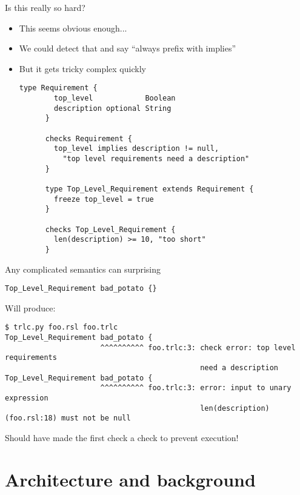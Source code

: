 \documentclass[aspectratio=169]{beamer}
\begin{document}
\begin{frame}[fragile]{Is this really so hard?}
  \begin{itemize}
  \item This seems obvious enough...
  \item We could detect that and say ``always prefix with implies''
    \pause
  \item But it gets tricky complex quickly
    \begin{lstlisting}[language=TRLC,gobble=6]
      type Requirement {
        top_level            Boolean
        description optional String
      }

      checks Requirement {
        top_level implies description != null,
          "top level requirements need a description"
      }

      type Top_Level_Requirement extends Requirement {
        freeze top_level = true
      }

      checks Top_Level_Requirement {
        len(description) >= 10, "too short"
      }
    \end{lstlisting}
  \end{itemize}
\end{frame}

\begin{frame}[fragile]{Any complicated semantics can surprising}
  \begin{lstlisting}[language=TRLC,gobble=6]
    Top_Level_Requirement bad_potato {}
  \end{lstlisting}
  Will produce:
  \begin{scriptsize}
\begin{verbatim}
$ trlc.py foo.rsl foo.trlc
Top_Level_Requirement bad_potato {
                      ^^^^^^^^^^ foo.trlc:3: check error: top level requirements
                                             need a description
Top_Level_Requirement bad_potato {
                      ^^^^^^^^^^ foo.trlc:3: error: input to unary expression
                                             len(description) (foo.rsl:18) must not be null
\end{verbatim}
  \end{scriptsize}

  \pause

  Should have made the first check a  check to
  prevent execution!
\end{frame}

\section{Architecture and background}
\end{document}

